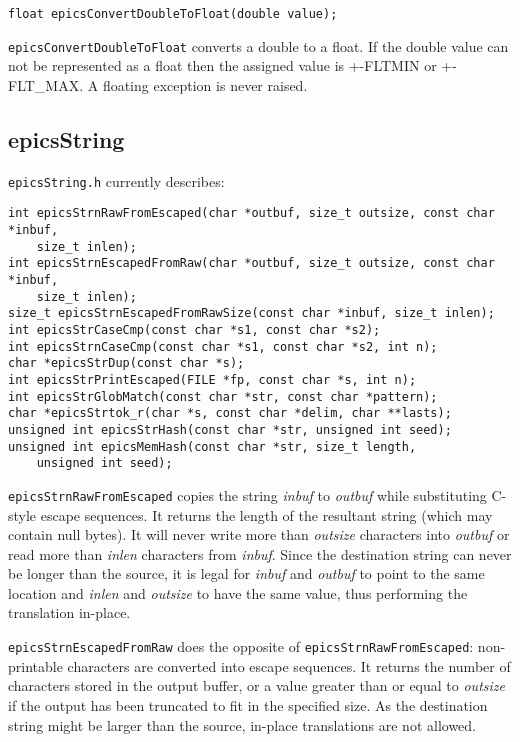 \begin{verbatim}float epicsConvertDoubleToFloat(double value);
\end{verbatim}\verb|epicsConvertDoubleToFloat| converts a double to a float. If the double value can not be represented as a float 
then the assigned value is +-FLTMIN or +- FLT\_MAX. A floating exception is never raised.

\subsection{epicsString}

\verb|epicsString.h| currently describes:

\begin{verbatim}int epicsStrnRawFromEscaped(char *outbuf, size_t outsize, const char *inbuf,
    size_t inlen);
int epicsStrnEscapedFromRaw(char *outbuf, size_t outsize, const char *inbuf,
    size_t inlen);
size_t epicsStrnEscapedFromRawSize(const char *inbuf, size_t inlen);
int epicsStrCaseCmp(const char *s1, const char *s2);
int epicsStrnCaseCmp(const char *s1, const char *s2, int n);
char *epicsStrDup(const char *s);
int epicsStrPrintEscaped(FILE *fp, const char *s, int n);
int epicsStrGlobMatch(const char *str, const char *pattern);
char *epicsStrtok_r(char *s, const char *delim, char **lasts);
unsigned int epicsStrHash(const char *str, unsigned int seed);
unsigned int epicsMemHash(const char *str, size_t length,
    unsigned int seed);
\end{verbatim}
\verb|epicsStrnRawFromEscaped| copies the string \emph{inbuf} to \emph{outbuf} while substituting C-style escape sequences. It returns 
the length of the resultant string (which may contain null bytes). It will never write more than \emph{outsize} characters into 
\emph{outbuf} or read more than \emph{inlen} characters from \emph{inbuf}. Since the destination string can never be longer than the source, it is 
legal for \emph{inbuf} and \emph{outbuf} to point to the same location and \emph{inlen} and \emph{outsize} to have the same value, thus performing the 
translation in-place.

\verb|epicsStrnEscapedFromRaw| does the opposite of \verb|epicsStrnRawFromEscaped|: non-printable characters are 
converted into escape sequences. It returns the number of characters stored in the output buffer, or a value greater than or 
equal to \emph{outsize} if the output has been truncated to fit in the specified size. As the destination string might be larger than 
the source, in-place translations are not allowed.

